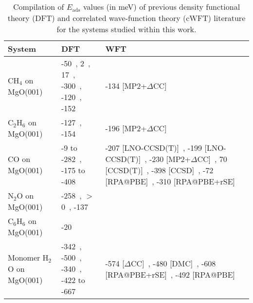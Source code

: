 \begin{table}

\caption{\label{tab:comp_lit}Compilation of $E_\text{ads}$ values (in meV) of previous density functional theory (DFT) and correlated wave-function theory (cWFT) literature for the systems studied within this work.}
\begin{adjustbox}{center,max width=0.85\textwidth}
\begin{tabular}{lp{7cm}p{7cm}}
\toprule
System & DFT & WFT \\ 
\midrule
CH$_4$ on MgO(001) & -50~\cite{trevethanBuildingBlocksMolecular2007}, 2~\cite{todnemMolecularAdsorptionMethane1999a}, 17~\cite{ferrariFTIRSpectroscopicDensity1998}, -300~\cite{manaeActivationCO2CH42022}, -120~\cite{mazheikaNiSubstitutionalDefects2016a}, -152~\cite{picciniEffectAnharmonicityAdsorption2014} & -134 [MP2+$\Delta$CC]~\cite{boeseAccurateAdsorptionEnergies2016} \\
C$_2$H$_6$ on MgO(001) & -127~\cite{boeseAccurateAdsorptionEnergies2016}, -154~\cite{boeseAccurateAdsorptionEnergies2016} & -196 [MP2+$\Delta$CC]~\cite{boeseAccurateAdsorptionEnergies2016} \\
CO on MgO(001) & -9 to -282~\cite{valeroGoodPerformanceM062008e}, -175 to -408~\cite{r.rehakIncludingDispersionDensity2020} & -207 [LNO-CCSD(T)]~\cite{yeAdsorptionVibrationalSpectroscopy2024a}, -199 [LNO-CCSD(T)]~\cite{shiManyBodyMethodsSurface2023a}, -230 [MP2+$\Delta$CC]~\cite{alessioChemicallyAccurateAdsorption2018}, 70 [CCSD(T)]~\cite{mazheikaNiSubstitutionalDefects2016}, -398 [CCSD]~\cite{mitraPeriodicDensityMatrix2022a}, -72 [RPA@PBE]~\cite{bajdichSurfaceEnergeticsAlkalineearth2015b}, -310 [RPA@PBE+rSE]~\cite{bajdichSurfaceEnergeticsAlkalineearth2015b} \\
N$_2$O on MgO(001) & -258~\cite{huesgesDispersionCorrectedDFT2014}, $>$0~\cite{scagnelliCatalyticDissociationN2O2006}, -137~\cite{huesgesDispersionCorrectedDFT2014} &  \\
C$_6$H$_6$ on MgO(001) & -20~\cite{trevethanBuildingBlocksMolecular2007} &  \\
Monomer H$_2$O on MgO(001) & -342~\cite{giordanoPartialDissociationWater1998a}, -500~\cite{carrascoDynamicIonPairs2008}, -340~\cite{huTrendsWaterMonomer2011}, -422 to -667~\cite{kebedeComparingVanWaals2017} & -574 [$\Delta$CC]~\cite{alessioChemicallyAccurateAdsorption2018}, -480 [DMC]~\cite{karaltiAdsorptionWaterMolecule2012}, -608 [RPA@PBE+rSE]~\cite{bajdichSurfaceEnergeticsAlkalineearth2015b}, -492 [RPA@PBE]~\cite{bajdichSurfaceEnergeticsAlkalineearth2015b} \\

\end{tabular}
\end{adjustbox}
\end{table}
